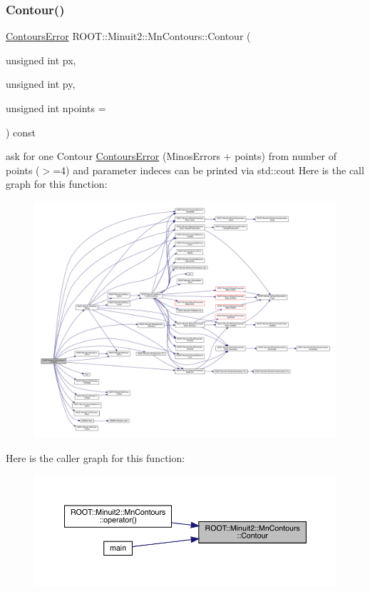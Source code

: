 \subsubsection{\texorpdfstring{Contour()}{Contour()}\hspace{0.1cm}{\footnotesize\ttfamily [1/2]}}
{\footnotesize\ttfamily \mbox{\hyperlink{classROOT_1_1Minuit2_1_1ContoursError}{Contours\+Error}} R\+O\+O\+T\+::\+Minuit2\+::\+Mn\+Contours\+::\+Contour (\begin{DoxyParamCaption}\item[{unsigned int}]{px,  }\item[{unsigned int}]{py,  }\item[{unsigned int}]{npoints = {} }\end{DoxyParamCaption}) const}

ask for one Contour \mbox{\hyperlink{classROOT_1_1Minuit2_1_1ContoursError}{Contours\+Error}} (Minos\+Errors + points) from number of points ($>$=4) and parameter indeces can be printed via std\+::cout Here is the call graph for this function\+:\nopagebreak
\begin{figure}[H]
\begin{center}
\leavevmode
\includegraphics[width=350pt]{d9/de7/classROOT_1_1Minuit2_1_1MnContours_a8bcd5be6a72acc39c1b56fd45e9958ba_cgraph}
\end{center}
\end{figure}
Here is the caller graph for this function\+:\nopagebreak
\begin{figure}[H]
\begin{center}
\leavevmode
\includegraphics[width=350pt]{d9/de7/classROOT_1_1Minuit2_1_1MnContours_a8bcd5be6a72acc39c1b56fd45e9958ba_icgraph}
\end{center}
\end{figure}

